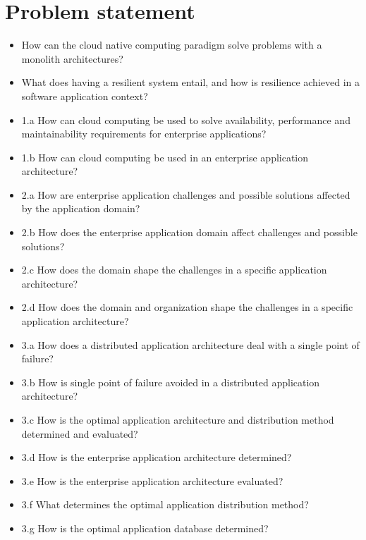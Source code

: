 \section{Problem statement}
\label{sc:problem_statement}

\begin{itemize}
\item How can the cloud native computing paradigm solve problems with a monolith architectures?
\item What does having a resilient system entail, and how is resilience achieved in a software application context?
\end{itemize}




\newpage
{}
\begin{itemize}  
\item 1.a How can cloud computing be used to solve availability, performance and maintainability requirements for enterprise applications?
\item 1.b How can cloud computing be used in an enterprise application architecture?

\item 2.a How are enterprise application challenges and possible solutions affected by the application domain?
\item 2.b How does the enterprise application domain affect challenges and possible solutions?
\item 2.c How does the domain shape the challenges in a specific application architecture?
\item 2.d How does the domain and organization shape the challenges in a specific application architecture?

\item 3.a How does a distributed application architecture deal with a single point of failure?
\item 3.b How is single point of failure avoided in a distributed application architecture?
\item 3.c How is the optimal application architecture and distribution method determined and evaluated?
\item 3.d How is the enterprise application architecture determined?
\item 3.e How is the enterprise application architecture evaluated?
\item 3.f What determines the optimal application distribution method?
\item 3.g How is the optimal application database determined?
\end{itemize}
